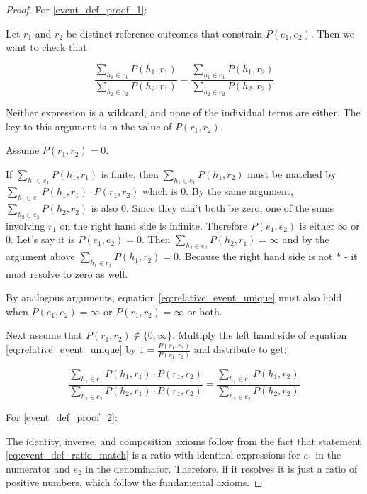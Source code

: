 \documentclass[twoside]{article}
\theoremstyle{plain}%
\theoremstyle{definition}
\theoremstyle{remark}
\begin{document}
\begin{proof}
For \ref{event_def_proof_1}:

Let \(r_1\) and \(r_2\) be distinct reference outcomes that constrain \(P(e_1, e_2)\). Then we want to check that

\begin{equation}
\label{eq:relative_event_unique}
\frac{\sum_{h_1 \in e_1} P(h_1, r_1)}{\sum_{h_2 \in e_2} P(h_2, r_1)} = \frac{\sum_{h_1 \in e_1} P(h_1, r_2)}{\sum_{h_2 \in e_2} P(h_2, r_2)}
\end{equation}

Neither expression is a wildcard, and none of the individual terms are either. The key to this argument is in the value of \(P(r_1, r_2)\).

Assume \(P(r_1, r_2) = 0\). 

If \(\sum_{h_1 \in e_1} P(h_1, r_1)\) is finite, then \(\sum_{h_1 \in e_1} P(h_1, r_2)\) must be matched by \(\sum_{h_1 \in e_1} P(h_1, r_1) \cdot P(r_1, r_2)\) which is 0. By the same argument, \(\sum_{h_2 \in e_2} P(h_2, r_2)\) is also 0. Since they can't both be zero, one of the sums involving \(r_1\) on the right hand side is infinite. Therefore \(P(e_1, e_2)\) is either \(\infty\) or 0. Let's say it is \(P(e_1, e_2) = 0\). Then \(\sum_{h_2 \in e_2} P(h_2, r_1) = \infty\) and by the argument above \(\sum_{h_1 \in e_1} P(h_1, r_2) = 0\). Because the right hand side is not \(\ast\) - it must resolve to zero as well.

By analogous arguments, equation \ref{eq:relative_event_unique} must also hold when \(P(e_1, e_2) = \infty\) or \(P(r_1, r_2) = \infty\) or both.

Next assume that \(P(r_1, r_2) \notin \{0, \infty\} \). Multiply the left hand side of equation \ref{eq:relative_event_unique} by \(1 = \frac{P(r_1, r_2)}{P(r_1, r_2)}\) and distribute to get:

\[\frac{\sum_{h_1 \in e_1} P(h_1, r_1) \cdot P(r_1, r_2)}{\sum_{h_2 \in e_2} P(h_2, r_1) \cdot P(r_1, r_2)} = \frac{\sum_{h_1 \in e_1} P(h_1, r_2)}{\sum_{h_2 \in e_2} P(h_2, r_2)}\]

For \ref{event_def_proof_2}:

The identity, inverse, and composition axioms follow from the fact that statement \ref{eq:event_def_ratio_match} is a ratio with identical expressions for \(e_1\) in the numerator and \(e_2\) in the denominator. Therefore, if it resolves it is just a ratio of positive numbers, which follow the fundamental axioms.
\end{proof}
\end{document}
